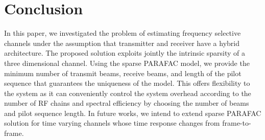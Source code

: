 \documentclass[conference]{IEEEtran}
\begin{document}
\section{Conclusion}
In this paper, we investigated the problem of estimating frequency selective
channels under the assumption that transmitter and receiver have a hybrid
architecture. The proposed solution exploits jointly the intrinsic sparsity of a
three dimensional channel. Using the sparse \gls{PARAFAC} model, we provide the minimum
number of transmit beams,  receive beams, and length of the pilot sequence that
guarantees the uniqueness of the model. This offers  flexibility to the system
as it can conveniently control the system overhead according to the number of \gls{RF} chains and spectral efficiency by choosing the number of beams and pilot
sequence length. In future works, we intend to extend sparse \gls{PARAFAC} solution for time
varying channels whose time response changes from frame-to-frame.

\newpage


\end{document}
